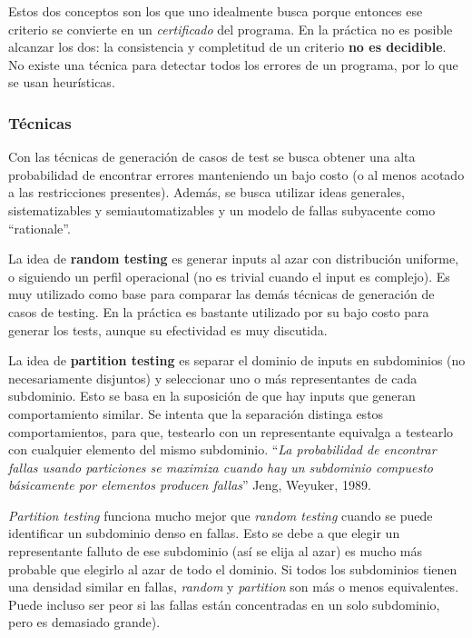 \documentclass[]{article}
\begin{document}
Estos dos conceptos son los que uno idealmente busca porque entonces ese criterio se convierte en un \textit{certificado} del programa. En la práctica no es posible alcanzar los dos: la consistencia y completitud de un criterio \textbf{no es decidible}. No existe una técnica para detectar todos los errores de un programa, por lo que se usan heurísticas.


\subsubsection{Técnicas}
Con las técnicas de generación de casos de test se busca obtener una alta probabilidad de encontrar errores manteniendo un bajo costo (o al menos acotado a las restricciones presentes). Además, se busca utilizar ideas generales, sistematizables y semiautomatizables y un modelo de fallas subyacente como “rationale”.

La idea de \textbf{random testing} es generar inputs al azar con distribución uniforme, o siguiendo un perfil operacional (no es trivial cuando el input es complejo). Es muy utilizado como base para comparar las demás técnicas de generación de casos de testing. En la práctica es bastante utilizado por su bajo costo para generar los tests, aunque su efectividad es muy discutida.

La idea de \textbf{partition testing} es separar el dominio de inputs en subdominios (no necesariamente disjuntos) y seleccionar uno o más representantes de cada subdominio. Esto se basa en la suposición de que hay inputs que generan comportamiento similar. Se intenta que la separación distinga estos comportamientos, para que, testearlo con un representante equivalga a testearlo con cualquier elemento del mismo subdominio. ``\textit{La probabilidad de encontrar fallas usando particiones se maximiza cuando hay un subdominio compuesto básicamente por elementos producen fallas}'' Jeng, Weyuker, 1989.

\textit{Partition testing} funciona mucho mejor que \textit{random testing} cuando se puede identificar un subdominio denso en fallas. Esto se debe a que elegir un representante falluto de ese subdominio (así se elija al azar) es mucho más probable que elegirlo al azar de todo el dominio. Si todos los subdominios tienen una densidad similar en fallas, \textit{random} y \textit{partition} son más o menos equivalentes. Puede incluso ser peor si las fallas están concentradas en un solo subdominio, pero es demasiado grande).
\end{document}
